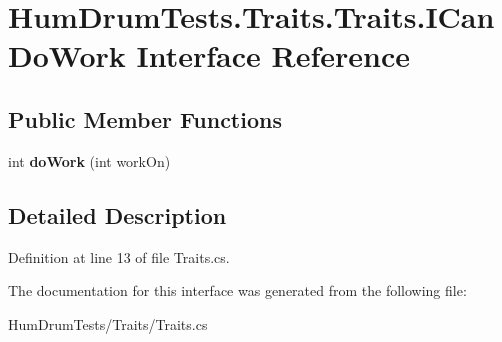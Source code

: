 \hypertarget{interfaceHumDrumTests_1_1Traits_1_1Traits_1_1ICanDoWork}{}\section{Hum\+Drum\+Tests.\+Traits.\+Traits.\+I\+Can\+Do\+Work Interface Reference}
\label{interfaceHumDrumTests_1_1Traits_1_1Traits_1_1ICanDoWork}
\subsection*{Public Member Functions}
\begin{DoxyCompactItemize}
\item 
\hypertarget{interfaceHumDrumTests_1_1Traits_1_1Traits_1_1ICanDoWork_a47299fd82eeb6ff377ef82a1520adbf2}{}int {\bfseries do\+Work} (int work\+On)\label{interfaceHumDrumTests_1_1Traits_1_1Traits_1_1ICanDoWork_a47299fd82eeb6ff377ef82a1520adbf2}

\end{DoxyCompactItemize}


\subsection{Detailed Description}


Definition at line 13 of file Traits.\+cs.



The documentation for this interface was generated from the following file\+:\begin{DoxyCompactItemize}
\item 
Hum\+Drum\+Tests/\+Traits/Traits.\+cs\end{DoxyCompactItemize}
